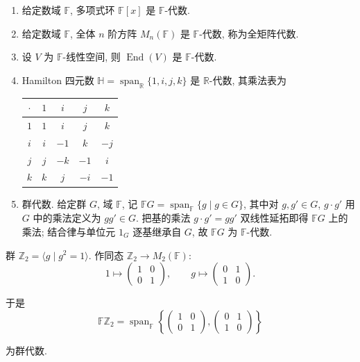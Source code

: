 \begin{example}\label{eg:algebra}
\mbox{}\par\vspace{-0.2em}
\begin{enumerate}
  \item 给定数域 $\mathbb{F}$, 多项式环 $\mathbb{F}[x]$ 是 $\mathbb{F}$-代数.
  \item 给定数域 $\mathbb{F}$, 全体 $n$ 阶方阵 $M_n(\mathbb{F})$ 是 $\mathbb{F}$-代数, 称为全矩阵代数.
  \item 设 $V$ 为 $\mathbb{F}$-线性空间, 则 $\operatorname{End}(V)$ 是 $\mathbb{F}$-代数.
  \item Hamilton 四元数 $\mathbb{H}=\operatorname{span}_{\mathbb{R}}\{1,i,j,k\}$ 是 $\mathbb{R}$-代数, 其乘法表为
  \begin{center}
  \begin{tabular}{c|cccc}
    $\cdot$ & $1$ & $i$ & $j$ & $k$\\
    \hline
    $1$ & $1$ & $i$ & $j$ & $k$\\
    $i$ & $i$ & $-1$ & $k$ & $-j$\\
    $j$ & $j$ & $-k$ & $-1$ & $i$\\
    $k$ & $k$ & $j$ & $-i$ & $-1$
  \end{tabular}
  \end{center}
  \item 群代数. 给定群 $G$, 域 $\mathbb{F}$, 记 $\mathbb{F}G=\operatorname{span}_{\mathbb{F}}\{g \mid g\in G\}$, 其中对 $g,g'\in G$, $g\cdot g'$ 用 $G$ 中的乘法定义为 $gg'\in G$. 把基的乘法 $g\cdot g'=gg'$ 双线性延拓即得 $\mathbb{F}G$ 上的乘法;
结合律与单位元 $1_G$ 逐基继承自 $G$, 故 $\mathbb{F}G$ 为 $\mathbb{F}$-代数.
\end{enumerate}
\end{example}

\begin{example}\label{eg:group-algebra-Z2}
群 $\mathbb{Z}_2=\langle g \mid g^2=1\rangle$. 作同态 $\mathbb{Z}_2\to M_2(\mathbb{F})$:
\[
  1\longmapsto \begin{pmatrix}1&0\\0&1\end{pmatrix},\qquad
  g\longmapsto \begin{pmatrix}0&1\\1&0\end{pmatrix}.
\]

于是
\[
  \mathbb{F}\mathbb{Z}_2=\operatorname{span}_{\mathbb{F}}\left\{
  \begin{pmatrix}1&0\\0&1\end{pmatrix},
  \begin{pmatrix}0&1\\1&0\end{pmatrix}\right\}
\]

为群代数.
\end{example}

